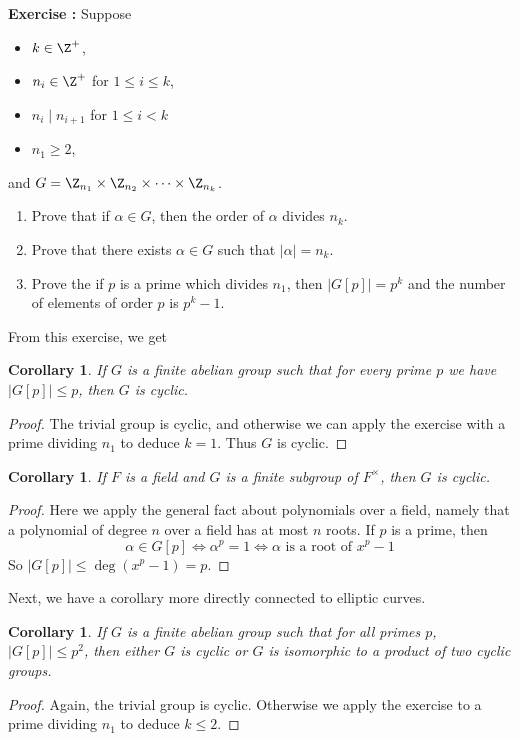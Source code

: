 \documentclass[12pt]{amsart}
\newcounter{probs}
\newenvironment{prob}{%
  \refstepcounter{probs}
  \par\medskip\noindent\textbf{Exercise \theprobs:} }{\par\medskip}
\theoremstyle{plain}
\newtheorem{cor}[thm]{Corollary}
\theoremstyle{definition}
\theoremstyle{remark}
\begin{document}
\begin{prob}
Suppose 
\begin{itemize}
\item $k\in \Z^+$, 
\item $n_i\in\Z^+$ for $1\leq i \leq k$, 
\item $n_i\mid n_{i+1}$ for $1\leq i < k$
\item $n_1\geq 2$,
\end{itemize}
and $G=\Z_{n_1}\times \Z_{n_2}\times\cdots \times \Z_{n_k}$.
\begin{enumerate}
\item Prove that if $\alpha\in G$, then the order of $\alpha$ divides
  $n_k$.
\item Prove that there exists $\alpha\in G$ such that $|\alpha|=n_k$.
\item Prove the if $p$ is a prime which divides $n_1$, then
  $|G[p]|=p^k$ and the number of elements of order $p$ is $p^k-1$.
\end{enumerate}
\end{prob}
From this exercise, we get
\begin{cor}\label{cyccor}
  If $G$ is a finite abelian group such that for every prime $p$ we
  have $|G[p]|\leq p$, then $G$ is cyclic.
\end{cor}
\begin{proof}
  The trivial group is cyclic, and otherwise we can apply the exercise
  with a prime dividing $n_1$ to deduce $k=1$.  Thus $G$ is cyclic.
\end{proof}
\begin{cor}
  If $F$ is a field and $G$ is a finite subgroup of $F^\times$, then
  $G$ is cyclic.
\end{cor}
\begin{proof}
  Here we apply the general fact about polynomials over a field,
  namely that a polynomial of degree $n$ over a field has at most $n$
  roots.  If $p$ is a prime, then 
\[
\alpha\in G[p] \iff \alpha^p = 1
 \iff \text{$\alpha$ is a root of $x^p-1$}\]
So $|G[p]|\leq \deg(x^p-1) = p$.
\end{proof}

Next, we have a corollary more directly connected to elliptic curves.
\begin{cor}
  If $G$ is a finite abelian group such that for all primes $p$,
  $|G[p]|\leq p^2$, then either $G$ is cyclic or $G$ is isomorphic to
  a product of two cyclic groups.
\end{cor}
\begin{proof}
  Again, the trivial group is cyclic.  Otherwise we apply the exercise
  to a prime dividing $n_1$ to deduce $k\leq 2$.
\end{proof}
\end{document}
